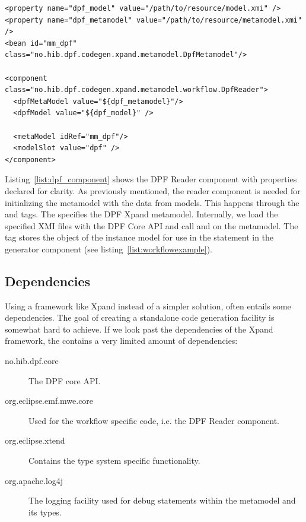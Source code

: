 \lstset{language=xml,caption=A MWE workflow that depicts the DPF Reader component.,label=list:dpf_component,captionpos=b}
\begin{table}[ht]
  \centering
\begin{lstlisting}[showstringspaces=false]
<property name="dpf_model" value="/path/to/resource/model.xmi" />
<property name="dpf_metamodel" value="/path/to/resource/metamodel.xmi" />
<bean id="mm_dpf" class="no.hib.dpf.codegen.xpand.metamodel.DpfMetamodel"/>

<component class="no.hib.dpf.codegen.xpand.metamodel.workflow.DpfReader">
  <dpfMetaModel value="${dpf_metamodel}"/>
  <dpfModel value="${dpf_model}" />

  <metaModel idRef="mm_dpf"/>
  <modelSlot value="dpf" />
</component>
\end{lstlisting}
\end{table}

Listing~\ref{list:dpf_component} shows the DPF Reader component with properties declared for clarity. As previously mentioned, the reader component is needed for initializing the metamodel with the data from models. This happens through the  and  tags. The  specifies the DPF Xpand metamodel. Internally, we load the specified XMI files with the DPF Core API and call  and  on the metamodel. The  tag stores the  object of the instance model for use in the  statement in the generator component (see listing~\ref{list:workflowexample}).

\newpage
\subsection{Dependencies}
Using a framework like Xpand instead of a simpler solution, often entails some dependencies. The goal of creating a standalone code generation facility is somewhat hard to achieve. If we look past the dependencies of the Xpand framework, the  contains a very limited amount of dependencies:
\begin{description}
  \item[no.hib.dpf.core] The DPF core API.
  \item[org.eclipse.emf.mwe.core] Used for the workflow specific code, i.e. the DPF Reader component.
  \item[org.eclipse.xtend] Contains the type system specific functionality.
  \item[org.apache.log4j] The logging facility used for debug statements within the metamodel and its types.
\end{description}

